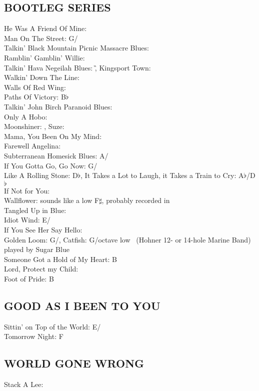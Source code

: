 \subsection{BOOTLEG SERIES}
He Was A Friend Of Mine: \D\\ Man On The Street: G/\C\\ Talkin' Black Mountain Picnic Massacre Blues: \G\\ Ramblin' Gamblin' Willie: \C\\ Talkin' Hava Negeilah Blues: \G,
Kingsport Town: \C\\ Walkin' Down The Line: \G\\ Walls Of Red Wing: \G\\ Paths Of Victory: B$\flat$\\ Talkin' John Birch Paranoid Blues: \G\\ Only A Hobo: \G\\ Moonshiner: \E,
Suze: \E\\ Mama, You Been On My Mind: \E\\ Farewell Angelina: \G\\ Subterranean Homesick Blues: A/\D\\ If You Gotta Go, Go Now: G/\C\\ Like A Rolling Stone: D$\flat$,
It Takes a Lot to Laugh, it Takes a Train to Cry: A$\flat$/D$\flat$\\ If Not for You: \G\\ Wallflower: sounds like a low F$\sharp$,
probably recorded in \G\\ Tangled Up in Blue: \E\\ Idiot Wind: E/\A\\ If You See Her Say Hello: \E\\ Golden Loom: G/\C,
Catfish: G/octave low \C\ (Hohner 12- or 14-hole Marine Band) played by
Sugar Blue\\ Someone Got a Hold of My Heart: B\\ Lord, Protect my Child: \G\\ Foot of Pride: B


\subsection{GOOD AS I BEEN TO YOU}
Sittin' on Top of the World: E/\A\\ Tomorrow Night: F


\subsection{WORLD GONE WRONG}
Stack A Lee: \C


